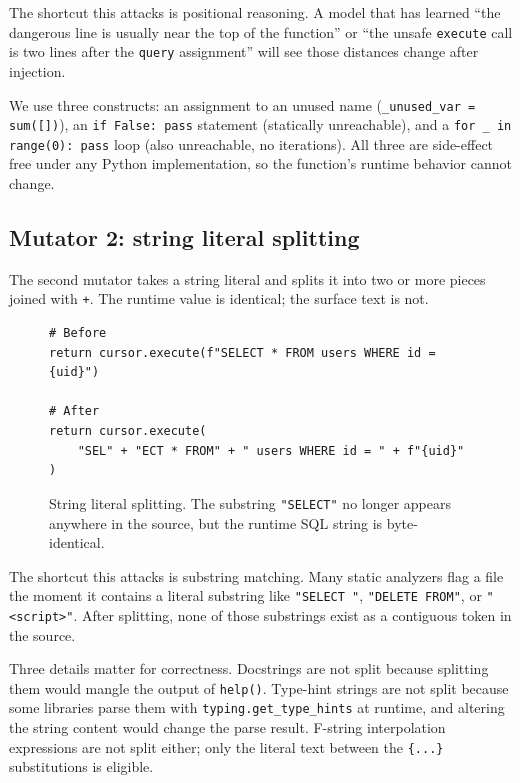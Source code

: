The shortcut this attacks is positional reasoning. A model that has
learned ``the dangerous line is usually near the top of the function''
or ``the unsafe \texttt{execute} call is two lines after the
\texttt{query} assignment'' will see those distances change after
injection.

We use three constructs: an assignment to an unused name
(\texttt{\_unused\_var = sum([])}), an \texttt{if False: pass}
statement (statically unreachable), and a \texttt{for \_ in range(0):
pass} loop (also unreachable, no iterations). All three are
side-effect free under any Python implementation, so the function's
runtime behavior cannot change.

\subsection{Mutator 2: string literal splitting}
\label{sec:method:stringsplit}

The second mutator takes a string literal and splits it into two or
more pieces joined with \texttt{+}. The runtime value is identical;
the surface text is not.

\begin{figure}[h]
\begin{verbatim}
# Before
return cursor.execute(f"SELECT * FROM users WHERE id = {uid}")

# After
return cursor.execute(
    "SEL" + "ECT * FROM" + " users WHERE id = " + f"{uid}"
)
\end{verbatim}
\caption{String literal splitting. The substring \texttt{"SELECT"} no
longer appears anywhere in the source, but the runtime SQL string is
byte-identical.}
\label{lst:stringsplit}
\end{figure}

The shortcut this attacks is substring matching. Many static analyzers
flag a file the moment it contains a literal substring like
\texttt{"SELECT "}, \texttt{"DELETE FROM"}, or \texttt{"<script>"}.
After splitting, none of those substrings exist as a contiguous token
in the source.

Three details matter for correctness. Docstrings are not split because
splitting them would mangle the output of \texttt{help()}. Type-hint
strings are not split because some libraries parse them with
\texttt{typing.get\_type\_hints} at runtime, and altering the string
content would change the parse result. F-string interpolation
expressions are not split either; only the literal text between the
\texttt{\{...\}} substitutions is eligible.

